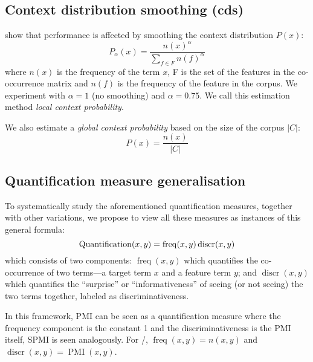 \subsection{Context distribution smoothing (cds)}
\label{sec:cont-distr-smooth}

 show that performance is affected by smoothing the context distribution $P(x)$:
%
\begin{equation}
  \label{eq:cds}
  P_{\alpha}(x) = \frac{n(x)^{\alpha}}{\sum_{f \in F}n(f)^{\alpha}}
\end{equation}
where $n(x)$ is the frequency of the term $x$, F is the set of the features in the co-occurrence matrix and $n(f)$ is the frequency of the feature in the corpus. We experiment with $\alpha=1$ (no smoothing) and $\alpha = 0.75$. We call this estimation method \emph{local context probability}.

We also estimate a \emph{global context probability} based on the size of the corpus $|C|$:
%
\begin{equation}
  \label{eq:cds-nan}
  P(x) = \frac{n(x)}{|C|}
\end{equation}

\subsection{Quantification measure generalisation}
\label{sec:quantification-measures}

To systematically study the aforementioned quantification measures, together with other variations, we propose to view all these measures as instances of this general formula:
%
\begin{equation}
  \small
  \label{eq:association}
  \operatorname{Quantification}(x,y) = \operatorname{freq}(x, y)
                                       \operatorname{discr}(x, y)
\end{equation}
%
which consists of two components: $\operatorname{freq}(x, y)$ which quantifies the co-occurrence of two terms---a target term $x$ and a feature term $y$; and $\operatorname{discr}(x, y)$ which quantifies the ``surprise'' or ``informativeness'' of seeing (or not seeing) the two terms together, labeled as discriminativeness.

In this framework, PMI can be seen as a quantification measure where the frequency component is the constant 1 and the discriminativeness is the PMI itself, SPMI is seen analogously. For \NPMI/, $\operatorname{freq}(x, y) = n(x, y)$ and $\operatorname{discr}(x, y) = \operatorname{PMI}(x, y)$.

